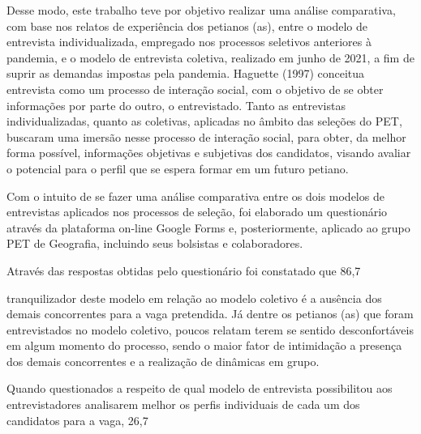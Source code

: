 Desse modo, este trabalho teve por objetivo realizar uma análise comparativa, com base nos relatos de experiência dos petianos (as), entre o modelo de entrevista individualizada, empregado nos processos seletivos anteriores à pandemia, e o modelo de entrevista coletiva, realizado em junho de 2021, a fim de suprir as demandas impostas pela pandemia. Haguette (1997) conceitua entrevista como um processo de interação social, com o objetivo de se obter informações por parte do outro, o entrevistado. Tanto as entrevistas individualizadas, quanto as coletivas, aplicadas no âmbito das seleções do PET, buscaram uma imersão nesse processo de interação social, para obter, da melhor forma possível, informações objetivas e subjetivas dos candidatos, visando avaliar o potencial para o perfil que se espera formar em um futuro petiano.

Com o intuito de se fazer uma análise comparativa entre os dois modelos de entrevistas aplicados nos processos de seleção, foi elaborado um questionário através da plataforma on-line Google Forms e, posteriormente, aplicado ao grupo PET de Geografia, incluindo seus bolsistas e colaboradores.

Através das respostas obtidas pelo questionário foi constatado que 86,7%

tranquilizador deste modelo em relação ao modelo coletivo é a ausência dos demais concorrentes para a vaga pretendida. Já dentre os petianos (as) que foram entrevistados no modelo coletivo, poucos relatam terem se sentido desconfortáveis em algum momento do processo, sendo o maior fator de intimidação a presença dos demais concorrentes e a realização de dinâmicas em grupo.

Quando questionados a respeito de qual modelo de entrevista possibilitou aos entrevistadores analisarem melhor os perfis individuais de cada um dos candidatos para a vaga, 26,7%

